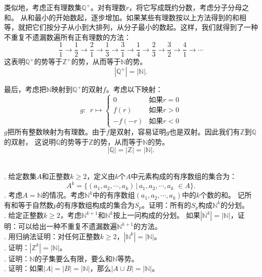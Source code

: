 \documentclass[12pt,UTF8]{ctexbook}
\begin{document}
类似地，考虑正有理数集$\mathbb{Q}^+$。对有理数$r$，将它写成既约分数，考虑分子分母之和。
从和最小的开始数起，逐步增加。如果某些有理数按以上方法得到的和相等，就把它们按分子从小到大排列，从分子最小的数起。这样，我们就得到了一种不重复不遗漏数遍所有正有理数的方法：
$$ \frac{1}{1} \rightarrow \frac{1}{2} \rightarrow \frac{2}{1} \rightarrow \frac{1}{3} \rightarrow \frac{3}{1} \rightarrow \frac{1}{4} \rightarrow \frac{2}{3} \rightarrow \frac{3}{2} \rightarrow \frac{4}{1} \rightarrow \cdots$$
这表明$\mathbb{Q}^+$的势等于$\mathbb{Z}^+$的势，从而等于$\mathbb{N}$的势。
$$ |\mathbb{Q}^+| = |\mathbb{N}|.$$

最后，考虑把$\mathbb{N}$映射到$\mathbb{Q}^+$的双射$f$。考虑以下映射：
$$ g:\,\,\,r\mapsto \left\{
    \begin{array}{cl}
        0 & \mbox{如果}r = 0 \\
        f(r) & \mbox{如果}r > 0 \\
        -f(-r)  & \mbox{如果}r < 0 
    \end{array}\right.
$$
$g$把所有整数映射为有理数。由于$f$是双射，容易证明$g$也是双射。因此我们有$\mathbb{Z}$到$\mathbb{Q}$的双射，
这说明$\mathbb{Q}$的势等于$\mathbb{Z}$的势，从而等于$\mathbb{N}$的势。
$$ |\mathbb{Q}| = |\mathbb{Z}| = |\mathbb{N}|.$$



\begin{xt}
    \mbox{} \\
    . 给定数集$A$和正整数$k\geqslant 2$，定义由$k$个$A$中元素构成的有序数组的集合为：
    $$ A^k = \{(a_1, a_2, \cdots, a_k) \, | \, a_1, a_2, \cdots, a_k \,\, \in A \}.$$
    . 考虑$A = \mathbb{N}$的情况。考虑$\mathbb{N}^k$中的有序数组$(a_1, a_2, \cdots, a_k)$中的$k$个数的和。
    记所有和等于自然数$p$的有序数组构成的集合为$S_p$。证明：所有的$S_p$构成$\mathbb{N}^k$的分划。\\
    . 给定正整数$k\geqslant 2$，考虑$\mathbb{N}^{k+1}$和$\mathbb{N}^{k}$按上一问构成的分划。
    如果$|\mathbb{N}^k| = |\mathbb{N}|$，证明：可以给出一种不重复不遗漏数遍$\mathbb{N}^{k+1}$的方法。\\
    . 用归纳法证明：对任何正整数$k\geqslant 2$，$|\mathbb{N}^k| = |\mathbb{N}|$。\\
    . 证明：$|\mathbb{Z}^k| = |\mathbb{N}|$。\\
    . 证明：$\mathbb{N}$的子集要么有限，要么和$\mathbb{N}$等势。\\
    . 证明：如果$|A| = |B| = |\mathbb{N}|$，那么$|A\cup B| = |\mathbb{N}|$。
\end{xt}
\end{document}
